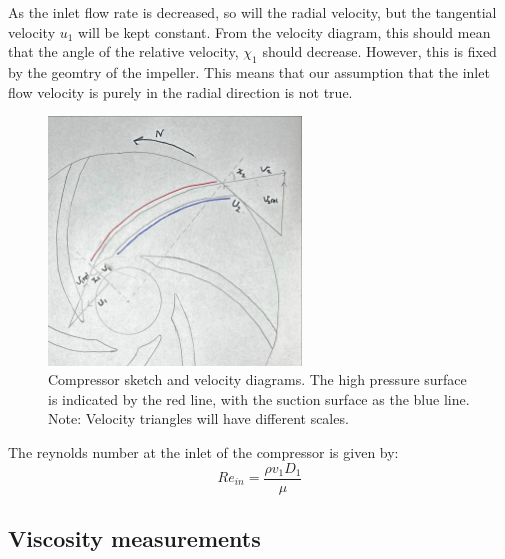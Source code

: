 \documentclass{article}
\begin{document}
As the inlet flow rate is decreased, so will the radial velocity, but the tangential velocity $u_1$ will be kept constant.
From the velocity diagram, this should mean that the angle of the relative velocity, $\chi_1$ should decrease.
However, this is fixed by the geomtry of the impeller.
This means that our assumption that the inlet flow velocity is purely in the radial direction is not true.


\begin{figure}[H]
    \centering
    \includegraphics[width=0.6\textwidth]{velocity_diagrams.jpg}
    \caption{Compressor sketch and velocity diagrams. The high pressure surface is indicated by the red line, with the suction surface as the blue line.
    Note: Velocity triangles will have different scales.}
    \label{fig:vel_diagrams}
\end{figure}



The reynolds number at the inlet of the compressor is given by:
\begin{equation}
    Re_{in} = \frac{\rho v_1 D_1}{\mu}
\end{equation}


\subsection{Viscosity measurements}
\end{document}
